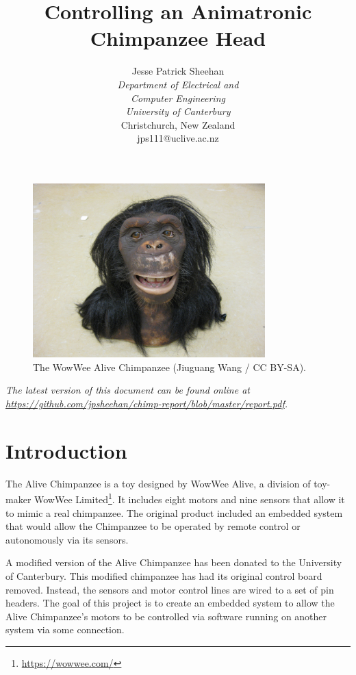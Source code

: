 \documentclass[12pt]{article} %
\title{Controlling an Animatronic Chimpanzee Head}
\author{
	Jesse Patrick Sheehan \\
	\textit{Department of Electrical and} \\
	\textit{Computer Engineering} \\
	\textit{University of Canterbury}\\
	Christchurch, New Zealand \\
	jps111@uclive.ac.nz
}
\begin{document}
\maketitle


\begin{figure}[h]
	\center
	\includegraphics[width=0.8\textwidth]{chimp}
	\caption{The WowWee Alive Chimpanzee (Jiuguang Wang / CC BY-SA).}
	\label{fig:chimp}
\end{figure}

\vfill

\noindent \small{\textit{
The latest version of this document can be found online at \url{https://github.com/jpsheehan/chimp-report/blob/master/report.pdf}.
}}

\newpage


\section{Introduction}

The Alive Chimpanzee is a toy designed by WowWee Alive, a division of toy-maker WowWee Limited\footnote{\url{https://wowwee.com/}}.
It includes eight motors and nine sensors that allow it to mimic a real chimpanzee.
The original product included an embedded system that would allow the Chimpanzee to be operated by remote control or autonomously via its sensors.

A modified version of the Alive Chimpanzee has been donated to the University of Canterbury.
This modified chimpanzee has had its original control board removed.
Instead, the sensors and motor control lines are wired to a set of pin headers.
The goal of this project is to create an embedded system to allow the Alive Chimpanzee's motors to be controlled via software running on another system via some connection.
\end{document}
